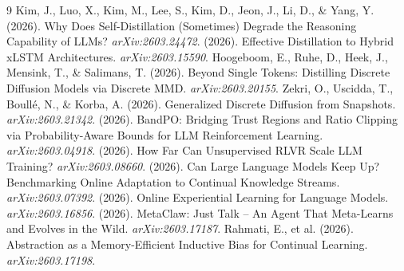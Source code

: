 \documentclass[11pt]{article}
\begin{document}
\begin{thebibliography}{9}
 Kim, J., Luo, X., Kim, M., Lee, S., Kim, D., Jeon, J., Li, D., \& Yang, Y. (2026). Why Does Self-Distillation (Sometimes) Degrade the Reasoning Capability of LLMs? \textit{arXiv:2603.24472}.
 (2026). Effective Distillation to Hybrid xLSTM Architectures. \textit{arXiv:2603.15590}.
 Hoogeboom, E., Ruhe, D., Heek, J., Mensink, T., \& Salimans, T. (2026). Beyond Single Tokens: Distilling Discrete Diffusion Models via Discrete MMD. \textit{arXiv:2603.20155}.
 Zekri, O., Uscidda, T., Boull\'{e}, N., \& Korba, A. (2026). Generalized Discrete Diffusion from Snapshots. \textit{arXiv:2603.21342}.
 (2026). BandPO: Bridging Trust Regions and Ratio Clipping via Probability-Aware Bounds for LLM Reinforcement Learning. \textit{arXiv:2603.04918}.
 (2026). How Far Can Unsupervised RLVR Scale LLM Training? \textit{arXiv:2603.08660}.
 (2026). Can Large Language Models Keep Up? Benchmarking Online Adaptation to Continual Knowledge Streams. \textit{arXiv:2603.07392}.
 (2026). Online Experiential Learning for Language Models. \textit{arXiv:2603.16856}.
 (2026). MetaClaw: Just Talk -- An Agent That Meta-Learns and Evolves in the Wild. \textit{arXiv:2603.17187}.
 Rahmati, E., et al. (2026). Abstraction as a Memory-Efficient Inductive Bias for Continual Learning. \textit{arXiv:2603.17198}.
\end{thebibliography}
\end{document}
